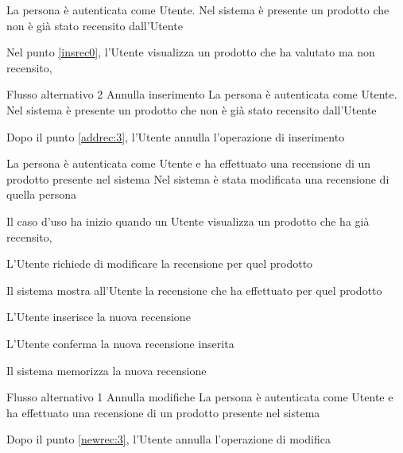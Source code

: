 {La persona è autenticata come Utente. Nel sistema è presente un prodotto che non è già stato recensito dall'Utente}%
{\postNulle}%
{\begin{enumCU}
		\item Nel punto \ref{insrec0}, l'Utente visualizza un prodotto che ha valutato ma non recensito, 
	\end{enumCU}}%
%
{Flusso alternativo 2}%
{Annulla inserimento}%
{La persona è autenticata come Utente. Nel sistema è presente un prodotto che non è già stato recensito dall'Utente}%
{\postNulle}%
{\begin{enumCU}
		\item Dopo il punto \ref{addrec:3}, l'Utente annulla l'operazione di inserimento
	\end{enumCU}}%


{}
{La persona è autenticata come Utente e ha effettuato una recensione di un prodotto presente nel sistema}
{Nel sistema è stata modificata una recensione di quella persona}
{\begin{enumCU}
	\item Il caso d'uso ha inizio quando un Utente visualizza un prodotto che ha già recensito, 
	\item L'Utente richiede di modificare la recensione per quel prodotto
	\item Il sistema mostra all'Utente la recensione che ha effettuato per quel prodotto
	\item L'Utente inserisce la nuova recensione \label{newrec:3}
	\item L'Utente conferma la nuova recensione inserita
	\item Il sistema memorizza la nuova recensione
\end{enumCU}}
%
{Flusso alternativo 1}%
{Annulla modifiche}%
{La persona è autenticata come Utente e ha effettuato una recensione di un prodotto presente nel sistema}
{\postNulle}%
{\begin{enumCU}
		\item Dopo il punto \ref{newrec:3}, l'Utente annulla l'operazione di modifica
	\end{enumCU}}%


